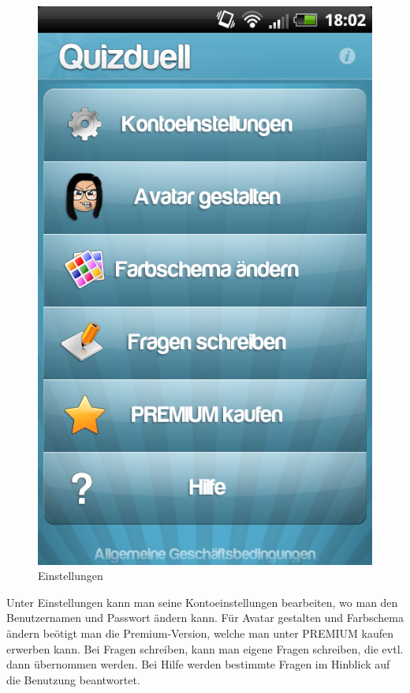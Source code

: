 \documentclass[fontsize=12pt,paper=a4,twoside]{scrartcl}
\begin{document}
\begin{figure}[H]
\centering
\includegraphics[scale=0.5]{Bilder/optionen.png}
\caption{Einstellungen}
\end{figure}

Unter Einstellungen kann man seine Kontoeinstellungen bearbeiten, wo man den Benutzernamen und Passwort ändern kann. Für Avatar gestalten und Farbschema ändern beötigt man die Premium-Version, welche man unter PREMIUM kaufen erwerben kann. Bei Fragen schreiben, kann man eigene Fragen schreiben, die evtl. dann übernommen werden. Bei Hilfe werden bestimmte Fragen im Hinblick auf die Benutzung beantwortet.\\
\end{document}
